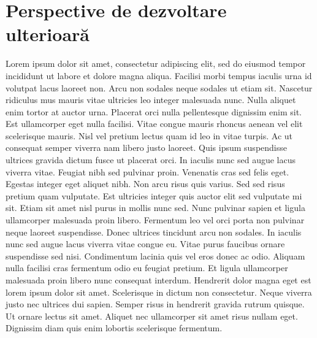 \section{Perspective de dezvoltare ulterioar\u{a}}
Lorem ipsum dolor sit amet, consectetur adipiscing elit, sed do eiusmod tempor incididunt ut labore et dolore magna aliqua. Facilisi morbi tempus iaculis urna id volutpat lacus laoreet non. Arcu non sodales neque sodales ut etiam sit. Nascetur ridiculus mus mauris vitae ultricies leo integer malesuada nunc. Nulla aliquet enim tortor at auctor urna. Placerat orci nulla pellentesque dignissim enim sit. Est ullamcorper eget nulla facilisi. Vitae congue mauris rhoncus aenean vel elit scelerisque mauris. Nisl vel pretium lectus quam id leo in vitae turpis. Ac ut consequat semper viverra nam libero justo laoreet. Quis ipsum suspendisse ultrices gravida dictum fusce ut placerat orci. In iaculis nunc sed augue lacus viverra vitae. Feugiat nibh sed pulvinar proin. Venenatis cras sed felis eget. Egestas integer eget aliquet nibh. Non arcu risus quis varius. Sed sed risus pretium quam vulputate.
Est ultricies integer quis auctor elit sed vulputate mi sit. Etiam sit amet nisl purus in mollis nunc sed. Nunc pulvinar sapien et ligula ullamcorper malesuada proin libero. Fermentum leo vel orci porta non pulvinar neque laoreet suspendisse. Donec ultrices tincidunt arcu non sodales. In iaculis nunc sed augue lacus viverra vitae congue eu. Vitae purus faucibus ornare suspendisse sed nisi. Condimentum lacinia quis vel eros donec ac odio. Aliquam nulla facilisi cras fermentum odio eu feugiat pretium. Et ligula ullamcorper malesuada proin libero nunc consequat interdum. Hendrerit dolor magna eget est lorem ipsum dolor sit amet. Scelerisque in dictum non consectetur. Neque viverra justo nec ultrices dui sapien. Semper risus in hendrerit gravida rutrum quisque. Ut ornare lectus sit amet. Aliquet nec ullamcorper sit amet risus nullam eget. Dignissim diam quis enim lobortis scelerisque fermentum.